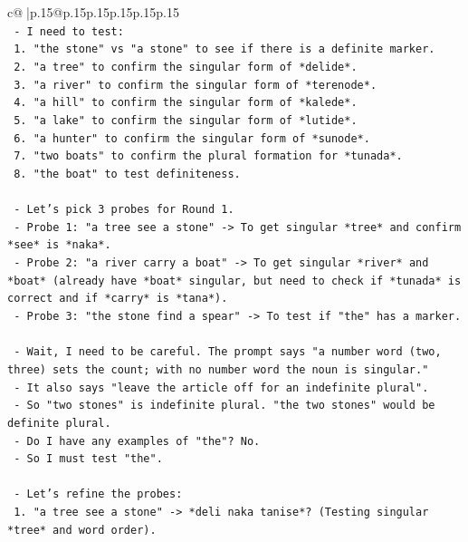 \documentclass{article}
\begin{document}
{\begin{supertabular}{c@{$\;$}|p{.15\linewidth}@{}p{.15\linewidth}p{.15\linewidth}p{.15\linewidth}p{.15\linewidth}p{.15\linewidth}}
{{{\\ 
\texttt{    {-} I need to test:} \\
\texttt{      1.  "the stone" vs "a stone" to see if there is a definite marker.} \\
\texttt{      2.  "a tree" to confirm the singular form of *delide*.} \\
\texttt{      3.  "a river" to confirm the singular form of *terenode*.} \\
\texttt{      4.  "a hill" to confirm the singular form of *kalede*.} \\
\texttt{      5.  "a lake" to confirm the singular form of *lutide*.} \\
\texttt{      6.  "a hunter" to confirm the singular form of *sunode*.} \\
\texttt{      7.  "two boats" to confirm the plural formation for *tunada*.} \\
\texttt{      8.  "the boat" to test definiteness.} \\
\\ 
\texttt{    {-} Let's pick 3 probes for Round 1.} \\
\texttt{    {-} Probe 1: "a tree see a stone" {-}> To get singular *tree* and confirm *see* is *naka*.} \\
\texttt{    {-} Probe 2: "a river carry a boat" {-}> To get singular *river* and *boat* (already have *boat* singular, but need to check if *tunada* is correct and if *carry* is *tana*).} \\
\texttt{    {-} Probe 3: "the stone find a spear" {-}> To test if "the" has a marker.} \\
\\ 
\texttt{    {-} Wait, I need to be careful. The prompt says "a number word (two, three) sets the count; with no number word the noun is singular."} \\
\texttt{    {-} It also says "leave the article off for an indefinite plural".} \\
\texttt{    {-} So "two stones" is indefinite plural. "the two stones" would be definite plural.} \\
\texttt{    {-} Do I have any examples of "the"? No.} \\
\texttt{    {-} So I must test "the".} \\
\\ 
\texttt{    {-} Let's refine the probes:} \\
\texttt{      1.  "a tree see a stone" {-}> *deli naka tanise*? (Testing singular *tree* and word order).} \\
}}}
\end{supertabular}}
\end{document}
